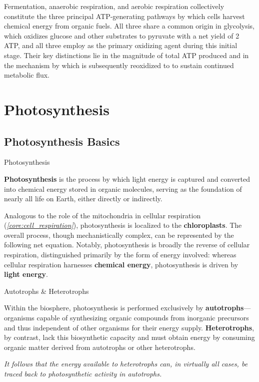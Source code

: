 \documentclass[10pt]{article}
\begin{document}
    Fermentation, anaerobic respiration, and aerobic respiration collectively constitute the three principal ATP-generating pathways by which cells harvest chemical energy from organic fuels. All three share a common origin in glycolysis, which oxidizes glucose and other substrates to pyruvate with a net yield of 2 ATP, and all three employ  as the primary oxidizing agent during this initial stage. Their key distinctions lie in the magnitude of total ATP produced and in the mechanism by which  is subsequently reoxidized to  to sustain continued metabolic flux.

\section{Photosynthesis}

  \subsection{Photosynthesis Basics}

    \begin{core}[label=core:photosynthesis]{Photosynthesis}

      \textbf{Photosynthesis} is the process by which light energy is captured and converted into chemical energy stored in organic molecules, serving as the foundation of nearly all life on Earth, either directly or indirectly.

      Analogous to the role of the mitochondria in cellular respiration (\textit{\autoref{core:cell_respiration}}), photosynthesis is localized to the \textbf{chloroplasts}. The overall process, though mechanistically complex, can be represented by the following net equation. Notably, photosynthesis is broadly the reverse of cellular respiration, distinguished primarily by the form of energy involved: whereas cellular respiration harnesses \textbf{chemical energy}, photosynthesis is driven by \textbf{light energy}.


    \end{core}

    \begin{core}{Autotrophs \& Heterotrophs}

      Within the biosphere, photosynthesis is performed exclusively by \textbf{autotrophs}---organisms capable of synthesizing organic compounds from inorganic precursors and thus independent of other organisms for their energy supply. \textbf{Heterotrophs}, by contrast, lack this biosynthetic capacity and must obtain energy by consuming organic matter derived from autotrophs or other heterotrophs.

      \textit{It follows that the energy available to heterotrophs can, in virtually all cases, be traced back to photosynthetic activity in autotrophs.}

    \end{core}
\end{document}
